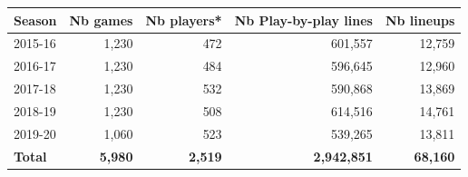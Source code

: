 \begin{tabular}{lrrrr}
Season & Nb games & Nb players* & Nb Play-by-play lines & Nb lineups \\
\midrule 
2015-16 & 1,230 & 472 & 601,557 & 12,759 \\
2016-17 & 1,230 & 484 & 596,645 & 12,960 \\
2017-18 & 1,230 & 532 & 590,868 & 13,869 \\
2018-19 & 1,230 & 508 & 614,516 & 14,761 \\
2019-20 & 1,060 & 523 & 539,265 & 13,811 \\
\midrule 
\textbf{Total} & \textbf{5,980} & \textbf{2,519} & \textbf{2,942,851} & \textbf{68,160} \\ 
\midrule 
\end{tabular}
